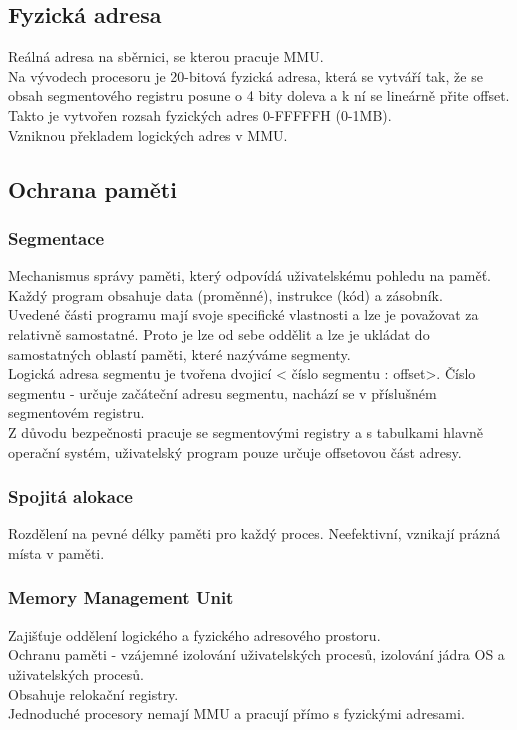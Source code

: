 \subsection{Fyzická adresa}
Reálná adresa na sběrnici, se kterou pracuje MMU.\\
Na vývodech procesoru je 20-bitová fyzická adresa, která se vytváří tak, že se obsah segmentového registru posune o 4 bity doleva a k ní se lineárně přite offset.
Takto je vytvořen rozsah fyzických adres 0-FFFFFH (0-1MB).\\
Vzniknou překladem logických adres v MMU.\\

\subsection{Ochrana paměti}
\subsubsection*{Segmentace}
Mechanismus správy paměti, který odpovídá uživatelskému pohledu na paměť. \\
Každý program obsahuje data (proměnné), instrukce (kód) a zásobník.\\
Uvedené části programu mají svoje specifické vlastnosti a lze je považovat za relativně samostatné. Proto je lze od sebe oddělit a lze je ukládat do samostatných oblastí paměti, které nazýváme segmenty.\\
Logická adresa segmentu je tvořena dvojicí < číslo segmentu : offset>. Číslo segmentu - určuje začáteční adresu segmentu, nachází se v příslušném segmentovém registru.\\
Z důvodu bezpečnosti pracuje se segmentovými registry a s tabulkami hlavně operační systém, uživatelský program pouze určuje offsetovou část adresy.\\

\subsubsection*{Spojitá alokace}
Rozdělení na pevné délky paměti pro každý proces.
Neefektivní, vznikají prázná místa v paměti.

\subsubsection*{Memory Management Unit}
Zajišťuje oddělení logického a fyzického  adresového prostoru.\\
Ochranu paměti - vzájemné izolování uživatelských procesů, izolování jádra OS a uživatelských procesů.\\
Obsahuje relokační registry.\\
Jednoduché procesory nemají MMU a pracují přímo s fyzickými adresami.\\

